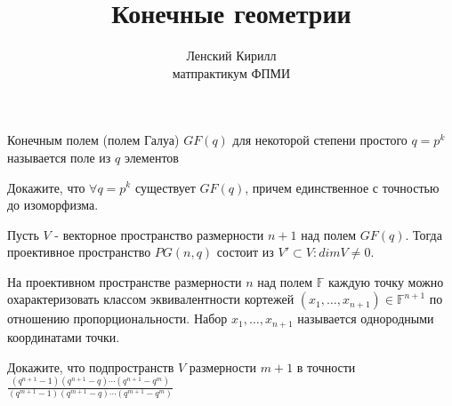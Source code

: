 \documentclass{article}
\newenvironment{definition}[2][Определение]{\begin{trivlist}
\item[\hskip \labelsep {\bfseries #1}\hskip \labelsep {\bfseries #2.}]}{\end{trivlist}}
\newenvironment{exercise}[2][Упражнение]{\begin{trivlist}
\item[\hskip \labelsep {\bfseries #1}\hskip \labelsep {\bfseries #2.}]}{\end{trivlist}}
\begin{document}
\title{Конечные геометрии}
\author{Ленский Кирилл\\матпрактикум ФПМИ}

\maketitle

%

\begin{definition}{(Конечное поле)}
Конечным полем (полем Галуа) $GF(q)$ для некоторой степени простого $q=p^k$ называется поле из $q$ элементов
\end{definition}
\begin{exercise}{(Корректность определения)}
Докажите, что $\forall{q=p^k}$ существует $GF(q)$, причем единственное с точностью до изоморфизма.
\end{exercise}

\begin{definition}{(Геометрия Галуа)}
Пусть $V$ - векторное пространство размерности $n+1$ над полем $GF(q)$. Тогда проективное пространство $PG(n,q)$ состоит из $V'\subset V:dim V \neq 0$.
\end{definition}

\begin{definition}{(Однородные координаты)}
На проективном пространстве размерности $n$ над полем $\mathbb{F}$ каждую точку можно охарактеризовать классом эквивалентности кортежей $(x_1,\dots,x_{n+1})\in\mathbb{F}^{n+1}$ по отношению пропорциональности. Набор $x_1,\dots,x_{n+1}$ называется однородными координатами точки.
\end{definition}

\begin{exercise}{(Число подпространств)}
Докажите, что подпространств $V$ размерности $m+1$ в точности $\frac{(q^{n+1}-1)(q^{n+1}-q)\cdots(q^{n+1}-q^{m})}{(q^{m+1}-1)(q^{m+1}-q)\cdots(q^{m+1}-q^m)}$
\end{exercise}
\end{document}
